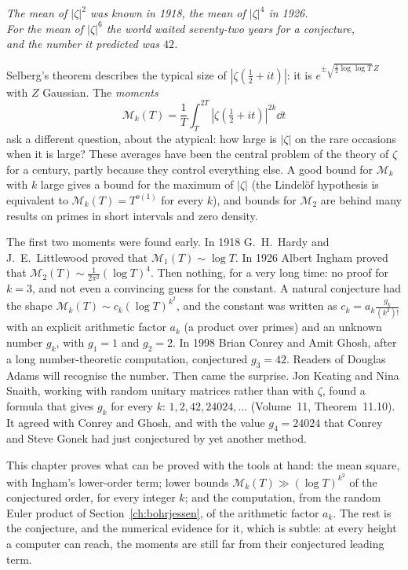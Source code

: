 \begin{center}\itshape
The mean of $|\zeta|^2$ was known in 1918, the mean of $|\zeta|^4$ in 1926.\\
For the mean of $|\zeta|^6$ the world waited seventy-two years for a conjecture,\\
and the number it predicted was $42$.
\end{center}

Selberg's theorem describes the typical size of $|\zeta(\frac12+it)|$: it is $e^{\pm\sqrt{\frac12\log\log T}\,Z}$ with $Z$ Gaussian. The \emph{moments}
\[
\mathcal M_k(T)=\frac1T\int_T^{2T}|\zeta(\tfrac12+it)|^{2k}\dd t
\]
ask a different question, about the atypical: how large is $|\zeta|$ on the rare occasions when it is large? These averages have been the central problem of the theory of $\zeta$ for a century, partly because they control everything else. A good bound for $\mathcal M_k$ with $k$ large gives a bound for the maximum of $|\zeta|$ (the Lindelöf hypothesis is equivalent to $\mathcal M_k(T)=T^{o(1)}$ for every $k$), and bounds for $\mathcal M_2$ are behind many results on primes in short intervals and zero density.

The first two moments were found early. In 1918 G.~H.~Hardy and J.~E.~Littlewood proved that $\mathcal M_1(T)\sim\log T$. In 1926 Albert Ingham proved that $\mathcal M_2(T)\sim\frac1{2\pi^2}(\log T)^4$. Then nothing, for a very long time: no proof for $k=3$, and not even a convincing guess for the constant. A natural conjecture had the shape $\mathcal M_k(T)\sim c_k(\log T)^{k^2}$, and the constant was written as $c_k=a_k\frac{g_k}{(k^2)!}$ with an explicit arithmetic factor $a_k$ (a product over primes) and an unknown number $g_k$, with $g_1=1$ and $g_2=2$. In 1998 Brian Conrey and Amit Ghosh, after a long number-theoretic computation, conjectured $g_3=42$. Readers of Douglas Adams will recognise the number. Then came the surprise. Jon Keating and Nina Snaith, working with random unitary matrices rather than with $\zeta$, found a formula that gives $g_k$ for every $k$: $1,2,42,24024,\dots$ (Volume~11, Theorem~11.10). It agreed with Conrey and Ghosh, and with the value $g_4=24024$ that Conrey and Steve Gonek had just conjectured by yet another method.

This chapter proves what can be proved with the tools at hand: the mean square, with Ingham's lower-order term; lower bounds $\mathcal M_k(T)\gg(\log T)^{k^2}$ of the conjectured order, for every integer $k$; and the computation, from the random Euler product of Section~\ref{ch:bohrjessen}, of the arithmetic factor $a_k$. The rest is the conjecture, and the numerical evidence for it, which is subtle: at every height a computer can reach, the moments are still far from their conjectured leading term.

